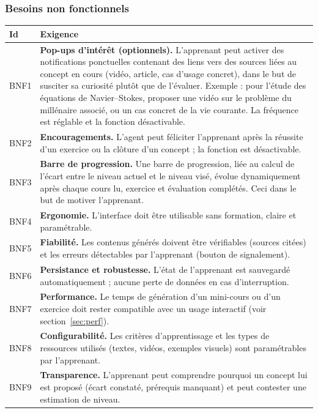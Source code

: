 \documentclass[11pt,a4paper]{article}
\begin{document}
\subsubsection{Besoins non fonctionnels}

\begin{center}
\renewcommand{\arraystretch}{1.25}
\begin{tabularx}{\textwidth}{@{}l X@{}}
\toprule
\textbf{Id} & \textbf{Exigence}\\
\midrule
BNF1 & \textbf{Pop-ups d'intérêt (optionnels).} L'apprenant peut activer des notifications ponctuelles contenant des liens vers des sources liées au concept en cours (vidéo, article, cas d'usage concret), dans le but de susciter sa curiosité plutôt que de l'évaluer. Exemple : pour l'étude des équations de Navier--Stokes, proposer une vidéo sur le problème du millénaire associé, ou un cas concret de la vie courante. La fréquence est réglable et la fonction désactivable.\\
BNF2 & \textbf{Encouragements.} L'agent peut féliciter l'apprenant après la réussite d'un exercice ou la clôture d'un concept ; la fonction est désactivable.\\
BNF3 & \textbf{Barre de progression.} Une barre de progression, liée au calcul de l'écart entre le niveau actuel et le niveau visé, évolue dynamiquement après chaque cours lu, exercice et évaluation complétés. Ceci dans le but de motiver l'apprenant.\\
BNF4 & \textbf{Ergonomie.} L'interface doit être utilisable sans formation, claire et paramétrable.\\
BNF5 & \textbf{Fiabilité.} Les contenus générés doivent être vérifiables (sources citées) et les erreurs détectables par l'apprenant (bouton de signalement).\\
BNF6 & \textbf{Persistance et robustesse.} L'état de l'apprenant est sauvegardé automatiquement ; aucune perte de données en cas d'interruption.\\
BNF7 & \textbf{Performance.} Le temps de génération d'un mini-cours ou d'un exercice doit rester compatible avec un usage interactif (voir section~\ref{sec:perf}).\\
BNF8 & \textbf{Configurabilité.} Les critères d'apprentissage et les types de ressources utilisés (textes, vidéos, exemples visuels) sont paramétrables par l'apprenant.\\
BNF9 & \textbf{Transparence.} L'apprenant peut comprendre pourquoi un concept lui est proposé (écart constaté, prérequis manquant) et peut contester une estimation de niveau.\\
\bottomrule
\end{tabularx}
\end{center}
\end{document}
